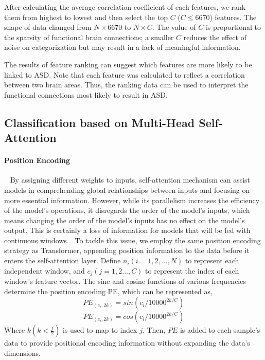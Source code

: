 \documentclass[a4paper]{cas-dc}
\begin{document}
After calculating the average correlation coefficient of each features, we rank them from highest to lowest and then select the top $C$ ($C\leq6670$) features. The shape of data changed from $N\times 6670$ to $N\times C$. The value of $C$ is proportional to the sparsity of functional brain connections; a smaller $C$ reduces the effect of noise on categorization but may result in a lack of meaningful information. 

The results of feature ranking can suggest which features are more likely to be linked to ASD. Note that each feature was calculated to reflect a correlation between two brain areas. Thus, the ranking data can be used to interpret the functional connections most likely to result in ASD.
\subsection{Classification based on Multi-Head Self-Attention}
\paragraph{Position Encoding}~{}
\newline
\indent By assigning different weights to inputs, self-attention mechanism can assist models in comprehending global relationships between inputs and focusing on more essential information. However, while its parallelism increases the efficiency of the model's operations, it disregards the order of the model's inputs, which means changing the order of the model's inputs has no effect on the model's output. This is certainly a loss of information for models that will be fed with continuous windows. 
To tackle this issue, we employ the same position encoding strategy as Transformer, appending position information to the data before it enters the self-attention layer. Define $n_i(i=1,2,..., N)$ to represent each independent window, and $c_j(j=1,2..., C)$ to represent the index of each window's feature vector. The sine and cosine functions of various frequencies determine the position encoding PE, which can be represented as,
\begin{equation}
	PE_{(c_i,2k)}=sin(c_i/10000^{2k/C})
\end{equation}
\begin{equation}
	PE_{(c_i,2k)}=cos(c_i/10000^{2k/C})
\end{equation}
Where $k(k<\frac{j}{2})$ is used to map to index $j$. Then, $PE$ is added to each sample's data to provide positional encoding information without expanding the data's dimensions.
\end{document}
